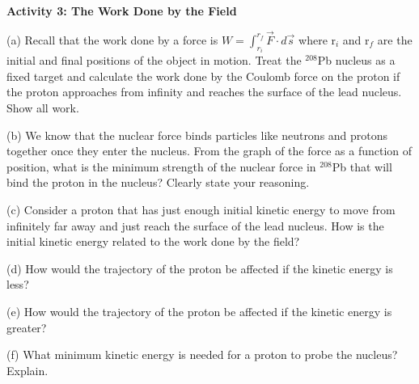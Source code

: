 \textbf{Activity 3: The Work Done by the Field}

(a) Recall that the work done by a force is \( W=\int ^{r_{f}}_{r_{i}}\overrightarrow{F}\cdot d\overrightarrow{s} \)
where r\( _{i} \) and r\( _{f} \) are the initial and final positions
of the object in motion. Treat the \( ^{208} \)Pb nucleus as a fixed
target and calculate the work done by the Coulomb force on the proton
if the proton approaches from infinity and reaches the surface of
the lead nucleus. Show all work.
\vspace{40mm}

(b) We know that the nuclear force binds particles like neutrons and
protons together once they enter the nucleus. From the graph of the
force as a function of position, what is the minimum strength of the
nuclear force in \( ^{208} \)Pb that will bind the proton in the
nucleus? Clearly state your reasoning.
\vspace{15mm}

(c) Consider a proton that has just enough initial kinetic energy
to move from infinitely far away and just reach the surface of the
lead nucleus. How is the initial kinetic energy related to the work
done by the field?
\vspace{15mm}

(d) How would the trajectory of the proton be affected if the kinetic
energy is less?
\vspace{15mm}

(e) How would the trajectory of the proton be affected if the kinetic
energy is greater?
\vspace{15mm}

(f) What minimum kinetic energy is needed for a proton to probe the
nucleus? Explain.\vspace{20mm}

